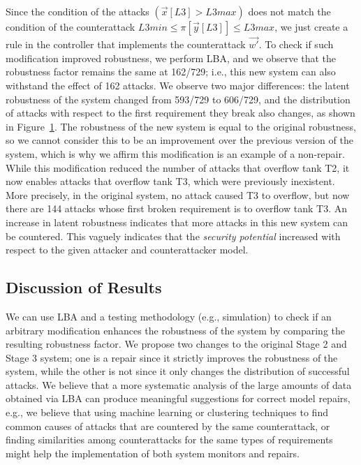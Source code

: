 {\begin{figure}[t]
  \label{fig:AttackDistribution}
\end{figure} 
Since the condition of the attacks $(\vec{x}[L3]>L3max)$ does not match the condition of the counterattack $L3min \leq \pi[\vec{y}[L3]]\leq L3max$, we just create a rule in the controller that implements the counterattack $\vec{w'}$. To check if such modification improved robustness, we perform LBA, and we observe that the robustness factor remains the same at 162/729; i.e., this new system can also withstand the effect of 162 attacks.  We observe two major differences: the latent robustness of the system changed from 593/729 to 606/729, and the distribution of attacks with respect to the first requirement they break also changes, as shown in Figure~\ref{fig:AttackDistribution}. The robustness of the new system is equal to the original robustness, so we cannot consider this to be an improvement over the previous version of the system, which is why we affirm this modification is an example of a non-repair. While this modification reduced the number of attacks that overflow tank T2, it now enables attacks that overflow tank T3, which were previously inexistent. More precisely, in the original system, no attack caused T3 to overflow, but now there are 144 attacks whose first broken requirement is to overflow tank T3. An increase in latent robustness indicates that more attacks in this new system can be countered. This vaguely indicates that the \emph{security potential} increased with respect to the given attacker and counterattacker model.



\subsection{Discussion of Results}
We can use LBA and a testing methodology (e.g., simulation) to check if an arbitrary modification enhances the robustness of the system by comparing the resulting robustness factor. 
We propose two changes to the original Stage 2 and Stage 3 system; one is a repair since it strictly improves the robustness of the system, while the other is not since it only changes the distribution of successful attacks. We believe that a more systematic analysis of the large amounts of data obtained via LBA can produce meaningful suggestions for correct model repairs, e.g., we believe that using machine learning or clustering techniques to find common causes of attacks that are countered by the same counterattack, or finding similarities among counterattacks for the same types of requirements might help the implementation of both system monitors and repairs. 

}
